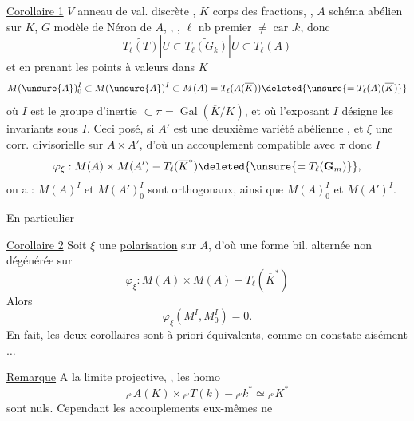 \uline{Corollaire 1} $V$ anneau de val. discrète , $K$ corps des fractions, , $A$ schéma abélien sur $K$, $G$ modèle de Néron de $A$, , , $\ell$ nb premier $\ne\operatorname{car}.k$,  donc
\[
\widetilde{T_\ell(T)}|U\subset\widetilde{T_\ell(G_k)}|U\subset T_\ell(A)
\]
et en prenant les points à valeurs dans $\overline K$
\[
M(\unsure{A})_0^I\subset M(\unsure{A})^I\subset M(A)=T_\ell(A(\overline K))\deleted{\unsure{=T_\ell(A)(\overline K)}}
\]
où $I$ est le groupe d'inertie $\subset\pi=\operatorname{Gal}(\overline K/K)$, et où l'exposant $I$ désigne les invariants sous $I$.
Ceci posé, si $A'$ est une deuxième variété abélienne , et $\xi$ une  corr. divisorielle sur $A\times A'$, d'où un accouplement compatible avec $\pi$ donc $I$
\[
\varphi_\xi:M(A)\times M(A')\mathbin{-}T_\ell(\overline K^*)\deleted{\unsure{=T_\ell(\mathbf G_m)}},
\]
on a :  $M(A)^I$ et $M(A')_0^I$ sont orthogonaux, ainsi que $M(A)_0^I$ et $M(A')^I$.

En particulier

\uline{Corollaire 2} Soit $\xi$ une \uline{polarisation} sur $A$, d'où une forme bil. alternée non dégénérée sur
\[
\varphi_\xi:M(A)\times M(A)\mathbin{-}T_\ell(\overline K^*)
\]
Alors
\[
\varphi_\xi(M^I,M_0^I)=0.
\]
En fait, les deux corollaires sont à priori équivalents, comme on constate aisément $\ldots$

\uline{Remarque} A la limite projective, , les homo
\[
{}_{\ell^\nu}A(K)\times{}_{\ell^\nu}T(k)\mathbin{-}{}_{\ell^\nu}k^*\simeq{}_{\ell^\nu}K^*
\]
sont nuls. Cependant les accouplements eux-mêmes ne
